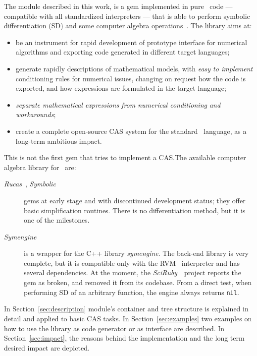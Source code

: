 The module described in this work, is a gem implemented in pure \Ruby~code --- compatible with all standardized interpreters --- that is able to perform symbolic differentiation (SD) and some computer algebra operations~\cite{von2013modern}. The library aims at:
\begin{itemize}
  \item be an instrument for rapid development of prototype interface for numerical algorithms and exporting code generated in different target languages;
  \item generate rapidly descriptions of mathematical models, with \emph{easy to implement} conditioning rules for numerical issues, changing on request how the code is exported, and how expressions are formulated in the target language;
  \item \emph{separate mathematical expressions from numerical conditioning and workarounds};
  \item create a complete open-source CAS system for the standard \Ruby~language, as a long-term ambitious impact.
\end{itemize}

This is not the first gem that tries to implement a CAS.\@ The available computer algebra library for \Ruby~are:
\begin{description}
  \item [\emph{Rucas}~\cite{rucas}, \emph{Symbolic}~\cite{symbolic}] gems at early stage and with discontinued development status; they offer basic simplification routines. There is no differentiation method, but it is one of the milestones.
  \item [\emph{Symengine}~\cite{symengine}] is a wrapper for the C++ library \emph{symengine}. The back-end library is very complete, but it is compatible only with the RVM \Ruby~interpreter and has several dependencies. At the moment, the \emph{SciRuby}~\cite{sciruby}~project reports the gem as broken, and removed it from its codebase. From a direct test, when performing SD of an arbitrary function, the engine always returns \texttt{nil}.
\end{description}

In Section~\ref{sec:description} module's container and tree structure is explained in detail and applied to basic CAS tasks. In Section~\ref{sec:examples} two examples on how to use the library as code generator or as interface are described. In Section~\ref{sec:impact}, the reasons behind the implementation and the long term desired impact are depicted.
